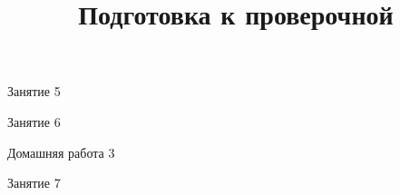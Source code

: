 \begin{class}[number=5]
	\begin{listofex}
		\item Занятие 5
	\end{listofex}
\end{class}
	
\begin{class}[number=6]
	\begin{listofex}
		\item Занятие 6
	\end{listofex}
\end{class}
	
\begin{homework}[number=3]
	\begin{listofex}
		\item Домашняя работа 3
	\end{listofex}
\end{homework}
	
\begin{class}[number=7]
	\title{Подготовка к проверочной}
	\begin{listofex}
		\item Занятие 7
	\end{listofex}
\end{class}
	
\begin{exam}
	\begin{listofex}
		\item 
	\end{listofex}
\end{exam}

